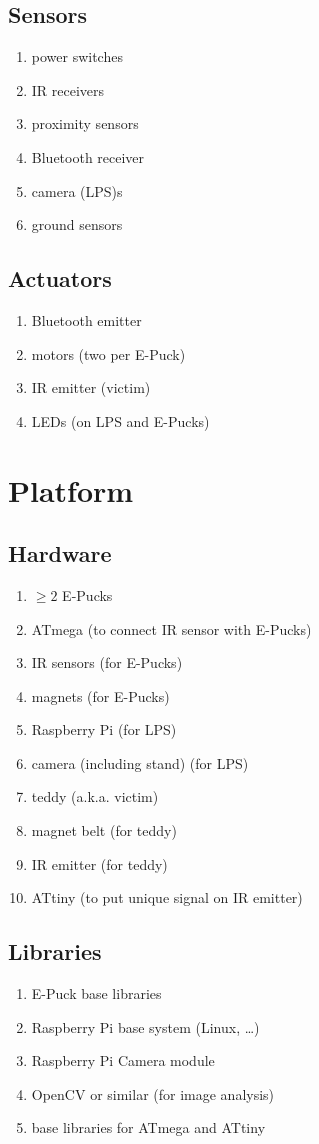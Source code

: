 \documentclass[a4paper,parskip,headheight=38pt]{scrartcl} %
\begin{document}
\subsection{Sensors}
\begin{enumerate}[label=\sensors]
\item power switches
\item IR receivers
\item proximity sensors
\item Bluetooth receiver
\item camera (LPS)s
\item ground sensors
\end{enumerate}

\subsection{Actuators}
\begin{enumerate}[label=\actuators]
\item Bluetooth emitter
\item motors (two per E-Puck)
\item IR emitter (victim)
\item LEDs (on LPS and E-Pucks)
\end{enumerate}


\section{Platform}

\subsection{Hardware}
\begin{enumerate}[label=\hardware]
\item $\ge 2$ E-Pucks
\item ATmega (to connect IR sensor with E-Pucks)
\item IR sensors (for E-Pucks)
\item magnets (for E-Pucks)
\item Raspberry Pi (for LPS)
\item camera (including stand) (for LPS)
\item teddy (a.k.a. victim)
\item magnet belt (for teddy)
\item IR emitter (for teddy)
\item ATtiny (to put unique signal on IR emitter)
\end{enumerate}

\subsection{Libraries}
\begin{enumerate}[label=\libs]
\item E-Puck base libraries
\item Raspberry Pi base system (Linux, \ldots)
\item Raspberry Pi Camera module
\item OpenCV or similar (for image analysis)
\item base libraries for ATmega and ATtiny
\end{enumerate}
\end{document}

